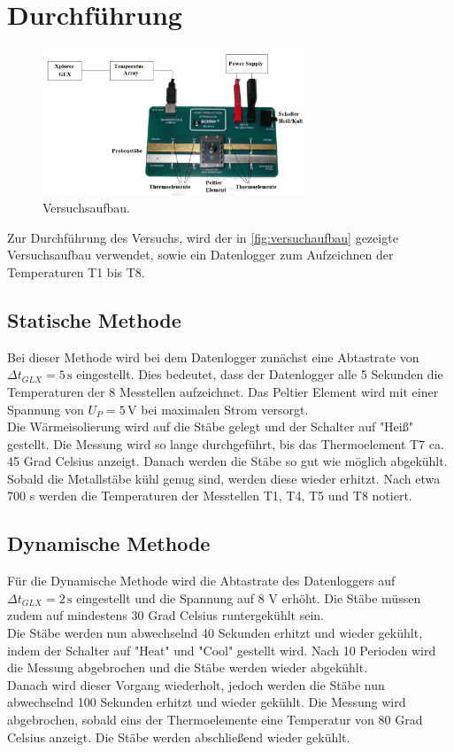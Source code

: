 \section{Durchführung}
\label{sec:Durchfuehrung}
\begin{figure}
    \centering
    \includegraphics[width=0.7\textwidth]{Versuchaufbau.png}
    \caption{Versuchsaufbau.}
    \label{fig:versuchaufbau}
  \end{figure}

Zur Durchführung des Versuchs, wird der in \autoref{fig:versuchaufbau} gezeigte Versuchsaufbau verwendet, sowie ein Datenlogger zum Aufzeichnen der Temperaturen
T1 bis T8.

\subsection{Statische Methode}
\label{sec:StatischeMethode}

Bei dieser Methode wird bei dem Datenlogger zunächst eine Abtastrate von $\Delta t_{GLX} = 5 \mathrm{\, s}$ eingestellt. Dies bedeutet, dass der Datenlogger alle
5 Sekunden die Temperaturen der 8 Messtellen aufzeichnet. Das Peltier Element wird mit einer Spannung von $U_P = 5 \mathrm{\, V}$ bei maximalen Strom versorgt. \\
Die Wärmeisolierung wird auf die Stäbe gelegt und der Schalter auf "Heiß" gestellt. Die Messung wird so lange durchgeführt, bis das Thermoelement T7 ca. 45 Grad 
Celsius anzeigt. Danach werden die Stäbe so gut wie möglich abgekühlt.\\
Sobald die Metallstäbe kühl genug sind, werden diese wieder erhitzt. Nach etwa 700 s werden die Temperaturen der Messtellen T1, T4, T5 und T8 notiert.

\subsection{Dynamische Methode}
\label{sec:DynamischeMethode} 

Für die Dynamische Methode wird die Abtastrate des Datenloggers auf $\Delta t_{GLX} = 2 \mathrm{\, s}$ eingestellt und die Spannung auf 8 V erhöht. Die Stäbe 
müssen zudem auf mindestens 30 Grad Celsius runtergekühlt sein.\\
Die Stäbe werden nun abwechselnd 40 Sekunden erhitzt und wieder gekühlt, indem der Schalter auf "Heat" und "Cool" gestellt wird. Nach 10 Perioden wird die Messung
abgebrochen und die Stäbe werden wieder abgekühlt.\\
Danach wird dieser Vorgang wiederholt, jedoch werden die Stäbe nun abwechselnd 100 Sekunden erhitzt und wieder gekühlt. Die Messung wird abgebrochen, sobald eins der
Thermoelemente eine Temperatur von 80 Grad Celsius anzeigt. Die Stäbe werden abschließend wieder gekühlt.